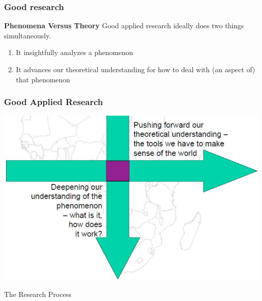 \documentclass{beamer}
\begin{document}

\begin{frame}
\frametitle{\textbf{Good research}}
\begin{block}{\textbf{Phenomena Versus Theory}}
Good applied research ideally does two things simultaneously.
\begin{enumerate}
\item It insightfully analyzes a phenomenon
\item It advances our theoretical understanding for how to deal with (an
aspect of) that phenomenon
\end{enumerate}

\end{block}
\end{frame}


\begin{frame}
\frametitle{\textbf{Good Applied Research}}
\includegraphics[width=\textwidth]{Applied_research}
\end{frame}

\begin{frame}
\begin{center}
\Huge The Research Process
\end{center}
\end{frame}
\end{document}
